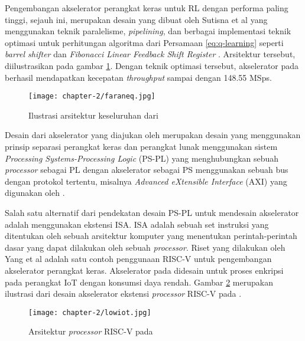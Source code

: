 Pengembangan akselerator perangkat keras untuk \ac{RL} dengan performa paling tinggi, sejauh ini, merupakan desain yang dibuat oleh Sutisna et al \parencite{sutisna2023faraneq} yang menggunakan teknik paralelisme, \textit{pipelining}, dan berbagai implementasi teknik optimasi untuk perhitungan algoritma dari Persamaan \ref{eq:q-learning} seperti \textit{barrel shifter}  dan \textit{Fibonacci Linear Feedback Shift Register} \parencite{panda2012FPGA}. Arsitektur tersebut, diilustrasikan pada gambar \ref{fig:ilustrasi-faraneq}. Dengan teknik optimasi tersebut, akselerator pada \parencite{sutisna2023faraneq} berhasil mendapatkan kecepatan \textit{throughput} sampai dengan 148.55 MSps.


\begin{figure}[h]
	\centering
	\texttt{[image: chapter-2/faraneq.jpg]}
	\caption{Ilustrasi arsitektur keseluruhan dari \parencite{sutisna2023faraneq}}
	\label{fig:ilustrasi-faraneq}
\end{figure}

Desain dari akselerator yang diajukan oleh \parencite{sutisna2023faraneq, dasilva2019parallel, panda2012FPGA} merupakan desain yang menggunakan prinsip separasi perangkat keras dan perangkat lunak menggunakan sistem \textit{Processing Systems-Processing Logic} (PS-PL) yang menghubungkan sebuah \textit{processor} sebagai PL dengan akselerator sebagai PS menggunakan sebuah bus dengan protokol tertentu, misalnya \textit{Advanced eXtensible Interface} (AXI) yang digunakan oleh \parencite{sutisna2023faraneq}.

Salah satu alternatif dari pendekatan desain PS-PL untuk mendesain akselerator adalah menggunakan ekstensi \ac{ISA}. \ac{ISA} adalah sebuah set instruksi yang ditentukan oleh sebuah arsitektur komputer yang menentukan perintah-perintah dasar yang dapat dilakukan oleh sebuah \textit{processor}. Riset yang dilakukan oleh Yang et al \parencite{yang2023design} adalah satu contoh penggunaan RISC-V untuk pengembangan akselerator perangkat keras. Akselerator pada \parencite{yang2023design} didesain untuk proses enkripsi pada perangkat \ac{IoT} dengan konsumsi daya rendah. Gambar \ref{fig:ilustrasi-lowiot} merupakan ilustrasi dari desain akselerator ekstensi \textit{processor} RISC-V pada \parencite{yang2023design}.

\begin{figure}[H]
	\centering
	\texttt{[image: chapter-2/lowiot.jpg]}
	\caption{Arsitektur \textit{processor} RISC-V pada \parencite{yang2023design}}
	\label{fig:ilustrasi-lowiot}
\end{figure}

